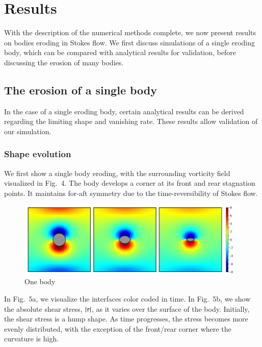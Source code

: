 \documentclass[preprint, 10pt]{elsarticle}
\begin{document}
\section{Results\label{s:results}} 

With the description of the numerical methods complete, we now present results on bodies eroding in Stokes flow. We first discuss simulations of a single eroding body, which can be compared with analytical results for validation, before discussing the erosion of many bodies.

\subsection{The erosion of a single body}

In the case of a single eroding body, certain analytical results can be derived regarding the limiting shape and vanishing rate. These results allow validation of our simulation.

\subsubsection{Shape evolution}

We first show a single body eroding, with the surrounding vorticity field visualized in Fig.~4. The body develops a corner at its front and rear stagnation points. It maintains for-aft symmetry due to the time-reversibility of Stokes flow.

\begin{figure}%
\begin{center}
\includegraphics[width = 0.9 \textwidth]{./figs/01bodseq.pdf}
\caption{One body}
\label{}
\end{center}
\end{figure}

In Fig.~5a, we visualize the interfaces color coded in time. In Fig.~5b, we show the absolute shear stress, $\lvert \tau \rvert$, as it varies over the surface of the body. Initially, the shear stress is a hump shape. As time progresses, the stress becomes more evenly distributed, with the exception of the front/rear corner where the curvature is high.
\end{document}
